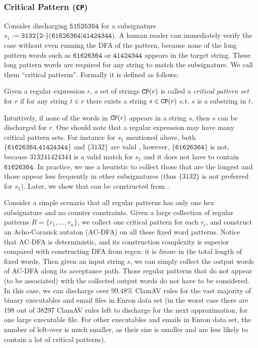 \subsubsection{Critical Pattern (\texttt{CP})}
Consider discharging $\texttt{51525354}$ for 
a subsignature $s_1 := \texttt{3132\{2-\}(61626364|41424344)}$.
A human reader can immediately
verify the case without even running the DFA of the pattern,
because none of the long pattern words such as $\texttt{61626364}$
or $\texttt{41424344}$ appears in the target string.
These long pattern words are required for any string to
match the subsignature. We call them ``critical patterns".
Formally it is defined as follows:

\begin{definition} \label{deff:cp}
Given a regular expression $r$, a set of strings
$\texttt{CP}(r)$ is called a {\em critical pattern set} for $r$
if for any string $t\in r$ there exists a string $s \in \texttt{CP}(r)$
s.t. $s$ is a substring in $t$.
\end{definition}

Intuitively, if none of the words in $\texttt{CP}(r)$ appears in a string
$s$, then $s$ can be discharged for $r$.  One should note that a 
regular expression may have many
critical pattern sets.  For instance for $s_1$
mentioned above, both $\{\texttt{61626364,41424344}\}$
and $\{3132\}$ are valid \cp, however, $\{\texttt{61626364}\}$
is not, because $\text{313241424344}$ is a valid match for
$s_1$ and it does not have to contain $\texttt{61626364}$.  
In practice, we use a heuristic to collect
those that are the longest and those appear less frequently 
in other subsignatures (thus $\{3132\}$ is not preferred for $s_1$). 
Later, we show that \cp can be constructed from \bw.

Consider a simple scenario that all regular patterns has only
one hex subsignature and no counter constraints.
Given a large collection of regular patterns $R = \{r_1, ..., r_n\}$,
we collect one critical pattern for each $r_i$, and construct
an Acho-Corasick autaton (AC-DFA) on all these fixed word patterns.
Notice that AC-DFA is deterministic, and its
construction complexity is superior compared with constructing DFA
from regex: it is {\em linear} in the total length of fixed words.
Then given an input string $s$, we can simply collect the output
words of AC-DFA along its acceptance path. Those regular patterns
that do not appear (to be associated) with the collected output words
do not have to be considered. 
In this case, we can discharge over $99.48\%$ ClamAV rules 
for the vast majority of binary executables and email files 
in Enron data set (in the worst case there are $198$ out of 38297 
ClamAV rules left to discharge for the next approximation, 
for one large executable file. For other executables and
emails in Enron data set, the number of left-over is much smaller, as
their size is smaller and are less likely to contain a lot of
critical patterns).

